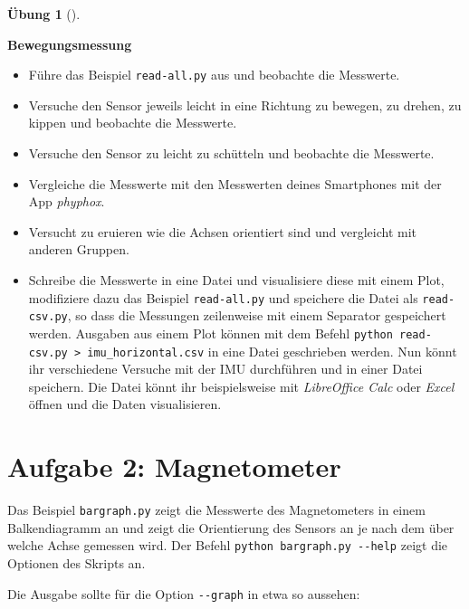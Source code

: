 \documentclass[
  11pt,
  a4paperpaper,
  oneside, openany  ,captions=tableheading
]{scrbook}
\providecommand{\tightlist}{%
  \setlength{\itemsep}{0pt}\setlength{\parskip}{0pt}}
\theoremstyle{definition}
\newtheorem{exercise}{Übung}[chapter]
\theoremstyle{remark}
\begin{document}
\begin{exercise}[]\protect\hypertarget{exr-bewegungsmessung}{}\label{exr-bewegungsmessung}

\textbf{Bewegungsmessung}\\

\begin{itemize}
\tightlist
\item
  Führe das Beispiel \texttt{read-all.py} aus und beobachte die
  Messwerte.
\item
  Versuche den Sensor jeweils leicht in eine Richtung zu bewegen, zu
  drehen, zu kippen und beobachte die Messwerte.
\item
  Versuche den Sensor zu leicht zu schütteln und beobachte die
  Messwerte.
\item
  Vergleiche die Messwerte mit den Messwerten deines Smartphones mit der
  App \emph{phyphox}.
\item
  Versucht zu eruieren wie die Achsen orientiert sind und vergleicht mit
  anderen Gruppen.
\item
  Schreibe die Messwerte in eine Datei und visualisiere diese mit einem
  Plot, modifiziere dazu das Beispiel \texttt{read-all.py} und speichere
  die Datei als \texttt{read-csv.py}, so dass die Messungen zeilenweise
  mit einem Separator gespeichert werden. Ausgaben aus einem Plot können
  mit dem Befehl
  \texttt{python\ read-csv.py\ \textgreater{}\ imu\_horizontal.csv} in
  eine Datei geschrieben werden. Nun könnt ihr verschiedene Versuche mit
  der IMU durchführen und in einer Datei speichern. Die Datei könnt ihr
  beispielsweise mit \emph{LibreOffice Calc} oder \emph{Excel} öffnen
  und die Daten visualisieren.
\end{itemize}

\end{exercise}

\section{Aufgabe 2: Magnetometer}\label{aufgabe-2-magnetometer}

Das Beispiel \texttt{bargraph.py} zeigt die Messwerte des Magnetometers
in einem Balkendiagramm an und zeigt die Orientierung des Sensors an je
nach dem über welche Achse gemessen wird. Der Befehl
\texttt{python\ bargraph.py\ -\/-help} zeigt die Optionen des Skripts
an.

Die Ausgabe sollte für die Option \texttt{-\/-graph} in etwa so
aussehen:
\end{document}
